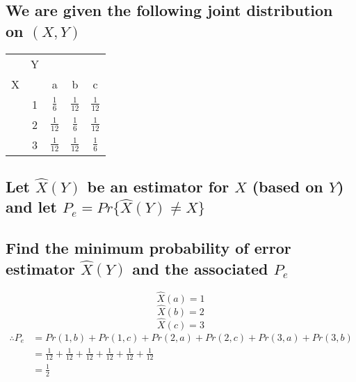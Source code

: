 \documentclass[11pt, oneside]{book}   	%
\begin{document}
\subsection*{We are given the following joint distribution on $(X,Y)$}
\begin{center}
\begin{tabular}{| c  c | c c c |}
\hline
& Y & & & \\
X & & a & b & c \\
\hline
& 1 & $\frac{1}{6}$ & $\frac{1}{12}$ & $\frac{1}{12}$ \\
& 2 & $\frac{1}{12}$ & $\frac{1}{6}$ & $\frac{1}{12}$ \\
& 3 & $\frac{1}{12}$ & $\frac{1}{12}$ & $\frac{1}{6}$ \\
\hline
\end{tabular}
\end{center}

\subsection*{Let $\hat{X} (Y)$ be an estimator for $X$ (based on $Y$) and let $P_e = Pr \{ \hat{X}(Y) \neq X \}$}
\subsection{Find the minimum probability of error estimator $\hat{X} (Y)$ and the associated $P_e$}
$$\hat{X} (a) = 1$$
$$\hat{X} (b) = 2$$
$$\hat{X} (c) = 3$$
\begin{equation}\label{}
\begin{split}
\therefore P_e & = Pr(1,b) + Pr(1,c) + Pr(2,a) + Pr(2,c) +Pr(3,a) + Pr(3,b) \\
& = \frac{1}{12} + \frac{1}{12} + \frac{1}{12} + \frac{1}{12} + \frac{1}{12} + \frac{1}{12} \\
& = \frac{1}{2}
\end{split}
\end{equation}
\end{document}

